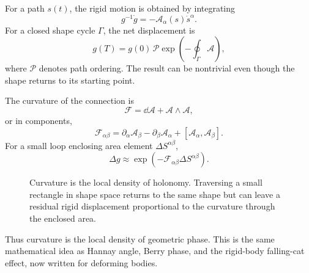For a path \(s(t)\), the rigid motion is obtained by integrating
\[
  g^{-1}\dot g=-\mathcal A_\alpha(s)\dot s^\alpha.
\]
For a closed shape cycle \(\Gamma\), the net displacement is
\[
  g(T)
  =
  g(0)\,
  \mathcal P\exp\left(
    -\oint_\Gamma \mathcal A
  \right),
\]
where \(\mathcal P\) denotes path ordering. The result can be nontrivial even
though the shape returns to its starting point.

The curvature of the connection is
\[
  \boxed{
  \mathcal F
  =
  \dd\mathcal A+\mathcal A\wedge\mathcal A,
  }
\]
or in components,
\[
  \mathcal F_{\alpha\beta}
  =
  \partial_\alpha\mathcal A_\beta
  -
  \partial_\beta\mathcal A_\alpha
  +
  [\mathcal A_\alpha,\mathcal A_\beta].
\]
For a small loop enclosing area element
\(\Delta S^{\alpha\beta}\),
\[
  \Delta g
  \approx
  \exp\left(
    -\mathcal F_{\alpha\beta}\Delta S^{\alpha\beta}
  \right).
\]

\begin{figure}[htbp]
\centering
{}
\caption{Curvature is the local density of holonomy. Traversing a small
rectangle in shape space returns to the same shape but can leave a residual
rigid displacement proportional to the curvature through the enclosed area.}
\label{fig:gauge-curvature-small-loop}
\end{figure}

Thus curvature is the local density of geometric phase. This is the same
mathematical idea as Hannay angle, Berry phase, and the rigid-body falling-cat
effect, now written for deforming bodies.


